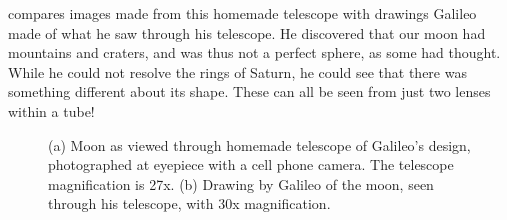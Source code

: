 \Fig{\ref{fig:moon}} compares images made from this homemade telescope with drawings Galileo made of what he saw through his telescope.  He discovered that our moon had mountains and craters, and was thus not a perfect sphere, as some had thought.  While he could not resolve the rings of Saturn, he could see that there was something different about its shape.  These can all be seen from just two lenses within a tube! 






\begin{figure}[t]
\centerline{
}
\caption{(a) Moon as viewed through homemade telescope of Galileo's design, photographed at eyepiece with a cell phone camera.  The telescope magnification is 27x.  (b) Drawing by Galileo of the moon, seen through his telescope, with 30x magnification.}
\label{fig:moon}
\end{figure}

